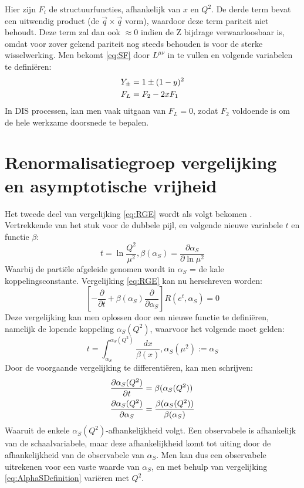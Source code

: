\documentclass[a4paper,11pt]{article}
\numberwithin{equation}{section} %
\begin{document}
Hier zijn $F_i$ de structuurfuncties, afhankelijk van $x$ en $Q^2$.
De derde term bevat een uitwendig product (de $\vec{q} \times \vec{q}$ vorm), waardoor deze term pariteit niet behoudt.
Deze term zal dan ook $\approx 0$ indien de Z bijdrage verwaarloosbaar is, omdat voor zover gekend pariteit nog steeds behouden is voor de sterke wisselwerking.
Men bekomt \eqref{eq:SF} door $L^{\mu \nu}$ in te vullen en volgende variabelen te definiëren:
\begin{align}
Y_\pm &= 1 \pm (1-y)^2 \notag \\
F_L &= F_2 - 2x F_1 \notag
\end{align}
In DIS processen, kan men vaak uitgaan van $F_L = 0$, zodat $F_2$ voldoende is om de hele werkzame doorsnede te bepalen.

\section{Renormalisatiegroep vergelijking en asymptotische vrijheid} \label{app:RGE}
Het tweede deel van vergelijking \eqref{eq:RGE} wordt als volgt bekomen \cite{Ellis}.
Vertrekkende van het stuk voor de dubbele pijl, en volgende nieuwe variabele $t$ en functie $\beta$:
\begin{equation}
t = \ln{\frac{Q^2}{\mu^2}}, \beta(\alpha_S) =  \frac{\partial \alpha_S}{\partial \ln{\mu^2}}
\end{equation}
Waarbij de partiële afgeleide genomen wordt in $\alpha_S$ = de kale koppelingsconstante.
Vergelijking \eqref{eq:RGE} kan nu herschreven worden:
\begin{equation}
\left[ -\frac{\partial}{\partial t} + \beta(\alpha_S) \frac{\partial}{\partial \alpha_S} \right] R(e^t, \alpha_S) = 0
\end{equation}
Deze vergelijking kan men oplossen door een nieuwe functie te definiëren, namelijk de lopende koppeling $\alpha_S(Q^2)$, waarvoor het volgende moet gelden:
\begin{equation} \label{eq:AlphaSDefinition}
t = \int_{\alpha_S}^{\alpha_S(Q^2)} \frac{dx}{\beta(x)}, \alpha_S(\mu^2) := \alpha_S
\end{equation}
Door de voorgaande vergelijking te differentiëren, kan men schrijven:
\begin{align}
\frac{\partial \alpha_S(Q^2)}{\partial t} &= \beta( \alpha_S(Q^2) ) \notag \\ \frac{\partial \alpha_S(Q^2)}{\partial \alpha_S} &= \frac{\beta(\alpha_S(Q^2))}{\beta(\alpha_S)}
\end{align}
Waaruit de enkele $\alpha_S(Q^2)$-afhankelijkheid volgt.
Een observabele is afhankelijk van de schaalvariabele, maar deze afhankelijkheid komt tot uiting door de afhankelijkheid van de observabele van $\alpha_S$.
Men kan dus een observabele uitrekenen voor een vaste waarde van $\alpha_S$, en met behulp van vergelijking \eqref{eq:AlphaSDefinition} variëren met $Q^2$.
\end{document}
